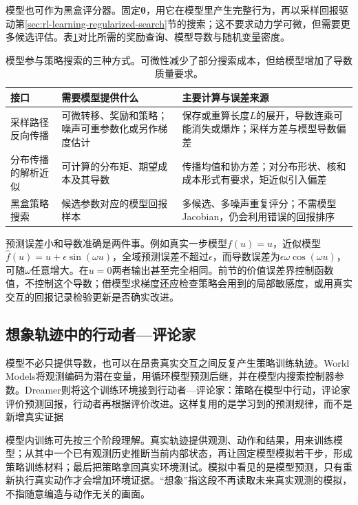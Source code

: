 模型也可作为黑盒评分器。固定$\bm\theta$，用它在模型里产生完整行为，再以采样回报驱动第\ref{sec:rl-learning-regularized-search}节的搜索；这不要求动力学可微，但需要更多候选评估。表\ref{tab:rl-learning-model-gradient-interfaces}对比所需的奖励查询、模型导数与随机变量密度。

\begin{table}[t]
  \centering
  \small
  \begin{tabularx}{\linewidth}{>{\raggedright\arraybackslash}p{25mm} >{\raggedright\arraybackslash}X >{\raggedright\arraybackslash}X}
    \toprule
    接口 & 需要模型提供什么 & 主要计算与误差来源 \\
    \midrule
    采样路径反向传播 & 可微转移、奖励和策略；噪声可重参数化或另作梯度估计 & 保存或重算长度$L$的展开，导数连乘可能消失或爆炸；采样方差与模型导数偏差 \\
    分布传播的解析近似 & 可计算的分布矩、期望成本及其导数 & 传播均值和协方差；对分布形状、核和成本形式有要求，矩近似引入偏差 \\
    黑盒策略搜索 & 候选参数对应的模型回报样本 & 多候选、多噪声重复评分；不需模型Jacobian，仍会利用错误的回报排序 \\
    \bottomrule
  \end{tabularx}
  \caption{模型参与策略搜索的三种方式。可微性减少了部分搜索成本，但给模型增加了导数质量要求。}
  \label{tab:rl-learning-model-gradient-interfaces}
\end{table}

预测误差小和导数准确是两件事。例如真实一步模型$f(u)=u$，近似模型
$\widehat f(u)=u+\epsilon\sin(\omega u)$，全域预测误差不超过$\epsilon$，而导数误差为$\epsilon\omega\cos(\omega u)$，可随$\omega$任意增大。在$u=0$两者输出甚至完全相同。前节的价值误差界控制函数值，不控制这个导数；借模型求梯度还应检查策略会用到的局部敏感度，或用真实交互的回报记录检验更新是否确实改进。

\subsection{想象轨迹中的行动者—评论家}
\label{sec:rl-learning-dreamer}

模型不必只提供导数，也可以在昂贵真实交互之间反复产生策略训练轨迹。World Models将观测编码为潜在变量，用循环模型预测后继，并在模型内搜索控制器参数。Dreamer则将这个训练环境接到行动者—评论家：策略在模型中行动，评论家评价预测回报，行动者再根据评价改进。这样复用的是学习到的预测规律，而不是新增真实证据

模型内训练可先按三个阶段理解。真实轨迹提供观测、动作和结果，用来训练模型；从其中一个已有观测历史推断当前内部状态，再让固定模型模拟若干步，形成策略训练材料；最后把策略拿回真实环境测试。模拟中看见的是模型预测，只有重新执行真实动作才会增加环境证据。“想象”指这段不再读取未来真实观测的模拟，不指随意编造与动作无关的画面。

